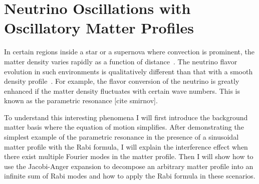
\chapter{\label{chap:matter}Neutrino Oscillations with Oscillatory Matter Profiles}

In certain regions inside a star or a supernova where convection is prominent, the matter density varies rapidly as a function of distance~\cite{Muller2015, Couch2015}. The neutrino flavor evolution in such environments is qualitatively different than that with a smooth density profile~\cite{Krastev1989, Loreti1994,Akhmedov2000, Friedland2006,Kneller2010,Kneller2013,Patton2014}. For example, the flavor conversion of the neutrino is greatly enhanced if the matter density fluctuates with certain wave numbers. This is known as the parametric resonance [cite smirnov].

To understand this interesting phenomena I will first introduce the background matter basis where the equation of motion simplifies. After demonstrating the simplest example of the parametric resonance in the presence of a sinusoidal matter profile with the Rabi formula, I will explain the interference effect when there exist multiple Fourier modes in the matter profile. Then I will show how to use the Jacobi-Anger expansion to decompose an arbitrary matter profile into an infinite sum of Rabi modes and how to apply the Rabi formula in these scenarios.






